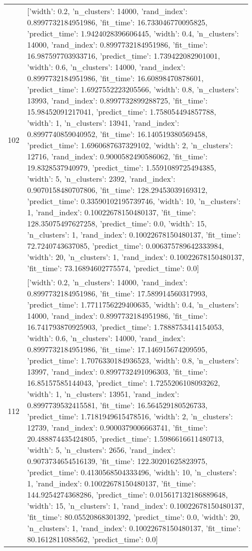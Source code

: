 \begin{tabular}{rl}
102 & [{'width': 0.2, 'n_clusters': 14000, 'rand_index': 0.8997732184951986, 'fit_time': 16.733046770095825, 'predict_time': 1.9424028396606445}, {'width': 0.4, 'n_clusters': 14000, 'rand_index': 0.8997732184951986, 'fit_time': 16.987597703933716, 'predict_time': 1.739422082901001}, {'width': 0.6, 'n_clusters': 14000, 'rand_index': 0.8997732184951986, 'fit_time': 16.60898470878601, 'predict_time': 1.6927552223205566}, {'width': 0.8, 'n_clusters': 13993, 'rand_index': 0.8997732899288725, 'fit_time': 15.98452091217041, 'predict_time': 1.758054494857788}, {'width': 1, 'n_clusters': 13941, 'rand_index': 0.8997740859040952, 'fit_time': 16.140519380569458, 'predict_time': 1.6960687637329102}, {'width': 2, 'n_clusters': 12716, 'rand_index': 0.9000582490586062, 'fit_time': 19.8328537940979, 'predict_time': 1.5591089725494385}, {'width': 5, 'n_clusters': 2392, 'rand_index': 0.9070158480707806, 'fit_time': 128.29453039169312, 'predict_time': 0.33590102195739746}, {'width': 10, 'n_clusters': 1, 'rand_index': 0.10022678150480137, 'fit_time': 128.35075497627258, 'predict_time': 0.0}, {'width': 15, 'n_clusters': 1, 'rand_index': 0.10022678150480137, 'fit_time': 72.7240743637085, 'predict_time': 0.006375789642333984}, {'width': 20, 'n_clusters': 1, 'rand_index': 0.10022678150480137, 'fit_time': 73.16894602775574, 'predict_time': 0.0}] \\
112 & [{'width': 0.2, 'n_clusters': 14000, 'rand_index': 0.8997732184951986, 'fit_time': 17.589914560317993, 'predict_time': 1.7711756229400635}, {'width': 0.4, 'n_clusters': 14000, 'rand_index': 0.8997732184951986, 'fit_time': 16.741793870925903, 'predict_time': 1.7888753414154053}, {'width': 0.6, 'n_clusters': 14000, 'rand_index': 0.8997732184951986, 'fit_time': 17.146915674209595, 'predict_time': 1.7076330184936523}, {'width': 0.8, 'n_clusters': 13997, 'rand_index': 0.8997732491096303, 'fit_time': 16.85157585144043, 'predict_time': 1.7255206108093262}, {'width': 1, 'n_clusters': 13951, 'rand_index': 0.8997739532415581, 'fit_time': 16.564529180526733, 'predict_time': 1.7181949615478516}, {'width': 2, 'n_clusters': 12739, 'rand_index': 0.9000379006663741, 'fit_time': 20.488874435424805, 'predict_time': 1.5986616611480713}, {'width': 5, 'n_clusters': 2656, 'rand_index': 0.9073734654516139, 'fit_time': 122.30201625823975, 'predict_time': 0.4130568504333496}, {'width': 10, 'n_clusters': 1, 'rand_index': 0.10022678150480137, 'fit_time': 144.9254274368286, 'predict_time': 0.015617132186889648}, {'width': 15, 'n_clusters': 1, 'rand_index': 0.10022678150480137, 'fit_time': 80.05520868301392, 'predict_time': 0.0}, {'width': 20, 'n_clusters': 1, 'rand_index': 0.10022678150480137, 'fit_time': 80.1612811088562, 'predict_time': 0.0}] \\

\end{tabular}
